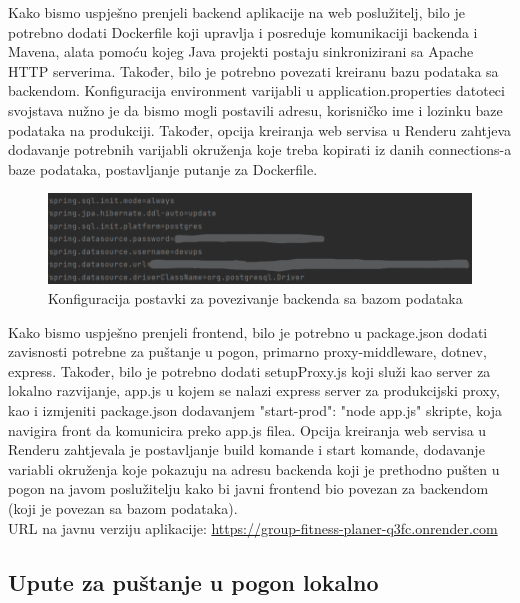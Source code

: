 {            {Kako bismo uspješno prenjeli backend aplikacije na web poslužitelj, bilo je potrebno dodati Dockerfile koji upravlja i posreduje komunikaciji backenda i Mavena, alata pomoću kojeg Java projekti postaju sinkronizirani sa Apache HTTP serverima. Također, bilo je potrebno povezati kreiranu bazu podataka sa backendom. Konfiguracija environment varijabli u application.properties datoteci svojstava nužno je da bismo mogli postavili adresu, korisničko ime i lozinku baze podataka na produkciji. Također, opcija kreiranja web servisa u Renderu zahtjeva dodavanje potrebnih varijabli okruženja koje treba kopirati iz danih connections-a baze podataka, postavljanje putanje za Dockerfile. }
            \begin{figure}[H]
                      \includegraphics[scale=0.5]{./Slike/config.png}
                      \centering
                      \caption{Konfiguracija postavki za povezivanje backenda sa bazom podataka}
                      \label{fig:promjene}
                \end{figure}

            {Kako bismo uspješno prenjeli frontend, bilo je potrebno u package.json dodati zavisnosti potrebne za puštanje u pogon, primarno proxy-middleware, dotnev, express. Također, bilo je potrebno dodati setupProxy.js koji služi kao server za lokalno razvijanje, app.js u kojem se nalazi express server za produkcijski proxy, kao i izmjeniti package.json dodavanjem "start-prod": "node app.js" skripte, koja navigira front da komunicira preko app.js filea. Opcija kreiranja web servisa u Renderu zahtjevala je postavljanje build komande i start komande, dodavanje variabli okruženja koje pokazuju na adresu backenda koji je prethodno pušten u pogon na javom poslužitelju kako bi javni frontend bio povezan za backendom (koji je povezan sa bazom podataka). \\
            URL na javnu verziju aplikacije: \href{https://group-fitness-planer-q3fc.onrender.com}{https://group-fitness-planer-q3fc.onrender.com}\\}

            \subsection{Upute za puštanje u pogon lokalno\\}
            
}
